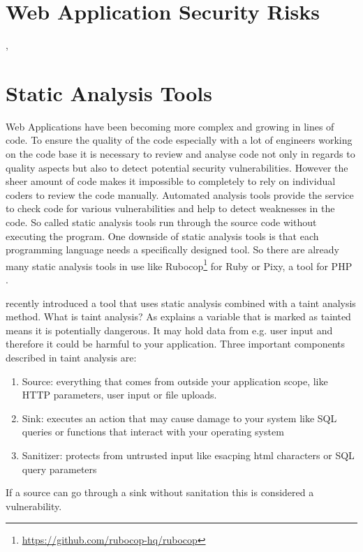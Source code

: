 \section{Web Application Security Risks}
\autocite[]{ElIdrissi2017}, \autocite[]{Li2014}
\section{Static Analysis Tools}
Web Applications have been becoming more complex and growing in lines of code. To ensure the quality of the code especially with a lot of engineers working on the code base it is necessary to review and analyse code not only in regards to quality aspects but also to detect potential security vulnerabilities. However the sheer amount of code makes it impossible to completely to rely on individual coders to review the code manually. Automated analysis tools provide the service to check code for various vulnerabilities and help to detect weaknesses in the code. So called static analysis tools run through the source code without executing the program. One downside of static analysis tools is that each programming language needs a specifically designed tool. So there are already many static analysis tools in use like Rubocop\footnote{ \url{https://github.com/rubocop-hq/rubocop}} for Ruby or Pixy, a tool for PHP \autocite[]{Jovanovic2006}.\newline


\textcite[]{Maskur2019} recently introduced a tool that uses static analysis combined with a taint analysis method. What is taint analysis? As \textcite[]{Shannon2018} explains a variable that is marked as tainted means it is potentially dangerous. It may hold data from e.g. user input and therefore it could be harmful to your application. Three important components described in taint analysis are:

\begin{enumerate}
    \item Source: everything that comes from outside your application scope, like HTTP parameters, user input or file uploads.
    \item Sink: executes an action that may cause damage to your system like SQL queries or functions that interact with your operating system
    \item Sanitizer: protects from untrusted input like esacping html characters or SQL query parameters
\end{enumerate}

If a source can go through a sink without sanitation this is considered a vulnerability.

